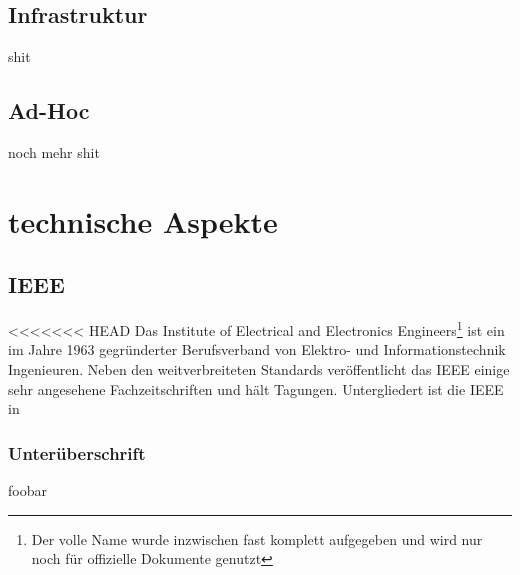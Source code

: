\documentclass[a4paper,13pt]{scrartcl}
\begin{document}
\subsection{Infrastruktur}

shit

\subsection{Ad-Hoc}

noch mehr shit

\section{technische Aspekte}
\subsection{IEEE}
<<<<<<< HEAD
Das Institute of Electrical and Electronics Engineers\footnote{Der volle Name wurde inzwischen fast komplett aufgegeben und wird nur noch für offizielle Dokumente genutzt} ist ein im Jahre 1963 gegründerter Berufsverband von Elektro- und Informationstechnik Ingenieuren. Neben den weitverbreiteten Standards veröffentlicht das IEEE einige sehr angesehene Fachzeitschriften und hält Tagungen. 
Untergliedert ist die IEEE in 
\subsubsection{Unterüberschrift}
foobar
\end{document}
